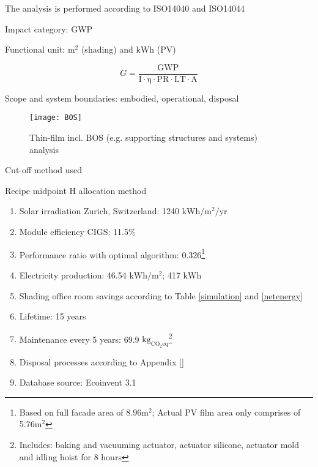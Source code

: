 The analysis is performed according to ISO14040 and ISO14044

Impact category: GWP

Functional unit: ${\mathrm{m^2}}$ (shading) and ${\mathrm{kWh}}$ (PV)

\begin{equation}
G=\frac{{\mathrm{GWP}}}{{\mathrm{I \cdot \eta  \cdot PR \cdot LT \cdot A}}}
\label{solar}
\end{equation}

Scope and system boundaries: embodied, operational, disposal

\begin{figure}[H]
\begin{center}
\texttt{[image: BOS]}
\caption{Thin-film incl. BOS (e.g. supporting structures and systems) analysis}
\label{compPV}
\end{center}
\end{figure}

Cut-off method used

Recipe midpoint H allocation method


\begin{enumerate}
\item Solar irradiation Zurich, Switzerland: 1240 ${\mathrm{kWh/m^2/yr}}$
\item Module efficiency CIGS: 11.5\%
\item Performance ratio with optimal algorithm: 0.326\footnote{Based on full facade area of 8.96${\mathrm{m^2}}$; Actual PV film area only comprises of 5.76${\mathrm{m^2}}$}
\item Electricity production: 46.54 ${\mathrm{kWh/m^2}}$; 417 ${\mathrm{kWh}}$
\item Shading office room savings according to Table \ref{simulation} and \ref{netenergy}
\item Lifetime: 15 years
\item Maintenance every 5 years: 69.9 ${\mathrm{kg_{CO_2eq}}}$\footnote{Includes: baking and vacuuming actuator, actuator silicone, actuator mold and idling hoist for 8 hours}
\item Disposal processes according to Appendix \ref{}
\item Database source: Ecoinvent 3.1
\end{enumerate}